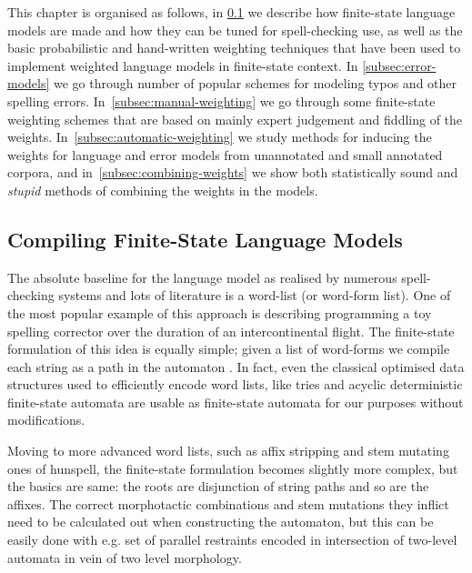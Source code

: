 \documentclass[a4paper,12pt]{article}
\begin{document}
This chapter is organised as follows, in \ref{subsec:language-models} we
describe how finite-state language models are made and how they can be tuned
for spell-checking use, as well as the basic probabilistic and hand-written
weighting techniques that have been used to implement weighted language models
in finite-state context. In \ref{subsec:error-models} we go through number of
popular schemes for modeling typos and other spelling errors.
In~\ref{subsec:manual-weighting} we go through some finite-state weighting
schemes that are based on mainly expert judgement and fiddling of the weights.
In~\ref{subsec:automatic-weighting} we study methods for inducing the weights
for language and error models from unannotated and small annotated corpora, and
in~\ref{subsec:combining-weights} we show both statistically sound and
\emph{stupid} methods of combining the weights in the models.

\subsection{Compiling Finite-State Language Models}
\label{subsec:language-models}

The absolute baseline for the language model as realised by numerous
spell-checking systems and lots of literature is a word-list (or word-form
list). One of the most popular example of this approach
is \cite[]{norvig/2010} describing programming a toy spelling corrector over
the duration of an intercontinental flight. The finite-state formulation of
this idea is equally simple; given a list of word-forms we compile each string
as a path in the automaton \cite[]{pirinen2012effects}. In fact, even the
classical optimised data structures used to efficiently encode word lists, like
tries and acyclic deterministic finite-state automata are usable as
finite-state automata for our purposes without modifications.

Moving to more advanced word lists, such as affix stripping and stem mutating
ones of hunspell, the finite-state formulation becomes slightly more complex,
but the basics are same: the roots are disjunction of string paths and so are
the affixes. The correct morphotactic combinations and stem mutations they
inflict need to be calculated out when constructing the automaton, but this can
be easily done with e.g. set of parallel restraints encoded in intersection of
two-level automata \cite[]{pirinen2010creating} in vein of two level
morphology.
\end{document}
